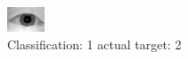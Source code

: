\begin{figure}[h!]
\begin{center}
\includegraphics[width=0.60\columnwidth]{figures/ID999_class_1_target_2.png}
\end{center}
\caption{ Classification: 1 actual target: 2}
\label{fig:ID999_class_1_target_2}
\end{figure}
